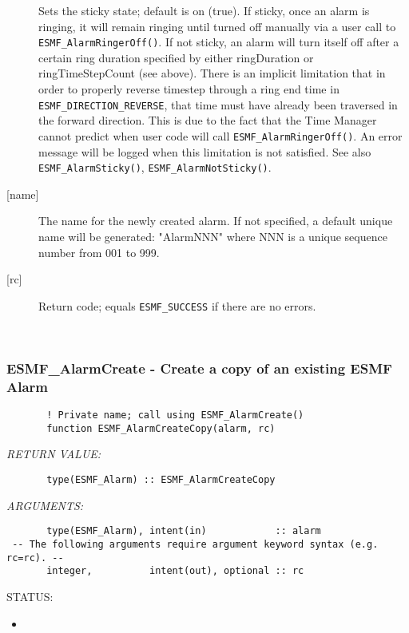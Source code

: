 \begin{description}
            Sets the sticky state; default is on (true).  If sticky,
            once an alarm is ringing, it will remain ringing until turned off
            manually via a user call to {\tt ESMF\_AlarmRingerOff()}.
            If not sticky, an alarm will turn itself off after a certain
            ring duration specified by either ringDuration or
            ringTimeStepCount (see above).  There is an implicit limitation
            that in order to properly reverse timestep through a ring end
            time in {\tt ESMF\_DIRECTION\_REVERSE}, that time must have already
            been traversed in the forward direction.  This is due to the fact
            that the Time Manager cannot predict when user code will call
            {\tt ESMF\_AlarmRingerOff()}.  An error message will be logged
            when this limitation is not satisfied.
            See also {\tt ESMF\_AlarmSticky()}, {\tt ESMF\_AlarmNotSticky()}.
       \item[{[name]}]
            The name for the newly created alarm.  If not specified,
            a default unique name will be generated: "AlarmNNN" where NNN
            is a unique sequence number from 001 to 999.
       \item[{[rc]}]
            Return code; equals {\tt ESMF\_SUCCESS} if there are no errors.
       \end{description}
   
 
\mbox{}\hrulefill\ 
 
\subsubsection [ESMF\_AlarmCreate] {ESMF\_AlarmCreate - Create a copy of an existing ESMF Alarm}


 
\begin{verbatim}       ! Private name; call using ESMF_AlarmCreate()
       function ESMF_AlarmCreateCopy(alarm, rc)
 \end{verbatim}{\em RETURN VALUE:}
\begin{verbatim}       type(ESMF_Alarm) :: ESMF_AlarmCreateCopy
 \end{verbatim}{\em ARGUMENTS:}
\begin{verbatim}       type(ESMF_Alarm), intent(in)            :: alarm
 -- The following arguments require argument keyword syntax (e.g. rc=rc). --
       integer,          intent(out), optional :: rc
 \end{verbatim}
{\sf STATUS:}
   \begin{itemize}
   \item{}
   \end{itemize}
  
